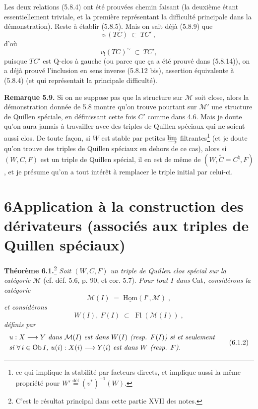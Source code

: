 \documentclass[11pt]{article}
\newcommand{\printedpage}[1]{\marginpar{\footnotesize p.~#1}}
\newcommand{\msp}[1]{\marginpar{\footnotesize [#1]}}
\newcommand{\Fl}{\operatorname{Fl}}
\newcommand{\Ob}{\operatorname{Ob}}
\newcommand{\defeq}{\overset{\text{déf}}{=}}
\newcommand{\cl}{^{\sim}}%
\begin{document}
Les deux relations (5.8.4) ont été prouvées chemin faisant (la deuxième étant essentiellement triviale, et la première représentant la difficulté principale dans la démonstration). Reste à établir (5.8.5). Mais on sait déjà (5.8.9) que
\[
v_!(TC) \ \subset \ TC'\ ,
\]
\msp{page 97}
d'où
\[
v_!(TC)\cl \ \subset \ TC',
\]
puisque $TC'$ est Q-clos à gauche (ou parce que ça a été prouvé dans (5.8.14)), on a déjà prouvé l'inclusion en sens inverse (5.8.12 bis), assertion équivalente à (5.8.4) (et qui représentait la principale difficulté).

\textbf{Remarque 5.9.} Si on ne suppose pas que la structure sur $\mathcal{M}$ soit close, alors la démonstration donnée de 5.8 montre qu'on trouve pourtant sur $\mathcal{M}'$ une structure de Quillen spéciale, en définissant cette fois $C'$ comme dans 4.6. Mais je doute qu'on aura jamais à travailler avec des triples de Quillen spéciaux qui ne soient aussi clos. De toute façon, si $W$ est stable par petites $\varinjlim$ filtrantes\footnote[28]{ce qui implique la stabilité par facteurs directs, et implique aussi la même propriété pour $W' \defeq (v^*)^{-1}(W)$.} (et je doute qu'on trouve des triples de Quillen spéciaux en dehors de ce cas), alors si $(W, C, F)$ est un triple de Quillen spécial, il en est de même de $(W, \tilde{C} = C^\natural, F)$, et je présume qu'on a tout intérêt à remplacer le triple initial par celui-ci. %

\printedpage{49}

\msp{page 98}

\section*{6\quad Application à la construction des dérivateurs (associés aux triples de Quillen spéciaux)}

\textbf{Théorème 6.1.}\footnote[29]{C'est le résultat principal dans cette partie XVII des notes.} \textit{Soit $(W,C,F)$ un triple de Quillen clos spécial sur la catégorie $\mathcal{M}$} (cf. déf. 5.6, p. 90, et cor. 5.7). \textit{Pour tout $I$ dans} Cat\textit{, considérons la catégorie}
\[
\mathcal{M}(I) \;=\; \underline{\mathrm{Hom}}(I^{\circ},\mathcal{M}) \;, \tag*{(6.1.1)}
\]
\textit{et considérons}
\[
W(I),\ F(I) \;\subset\; \Fl(\mathcal{M}(I)) \;,
\]
\textit{définis par}
\[
\begin{aligned}
&\text{\textit{$u : X \longrightarrow Y$ dans $\mathcal{M}(I)$ est dans $W(I)$ (resp. $F(I)$) si et seulement}}\\
&\text{\textit{si $\forall\, i \in \Ob I$, $u(i) : X(i) \longrightarrow Y(i)$ est dans $W$ (resp. $F$).}}
\end{aligned}
\tag*{(6.1.2)}
\]
\end{document}
